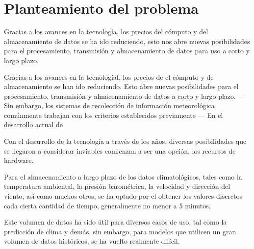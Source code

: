 \section{Planteamiento del problema}

Gracias a los avances en la tecnología, los precios del cómputo y del almacenamiento de datos se ha ido reduciendo, esto nos abre nuevas posibilidades para el procesamiento, transmisión y almacenamiento de datos para uso a corto y largo plazo.



Gracias a los avances en la tecnologíaf, los precios de el cómputo y de almacenamiento se han ido reduciendo. Esto abre nuevas posibilidades para el procesamiento, transmisión y almacenamiento de datos a corto y largo plazo. --- Sin embargo, los sistemas de recolección de información meteorológica comúnmente trabajan con los criterios establecidos previamente --- En el desarrollo actual de


Con el desarrollo de la tecnología a través de los años, diversas posibilidades que se llegaron a considerar inviables comienzan a ser una opción, los recursos de hardware.

Para el almacenamiento a largo plazo de los datos climatológicos, tales como la temperatura ambiental, la presión barométrica, la velocidad y dirección del viento, así como muchos otros, se ha optado por el obtener los valores discretos cada cierta cantidad de tiempo, generalmente no menor a 5 minutos. %

Este volumen de datos ha sido útil para diversos casos de uso, tal como la predicción de clima y demás, sin embargo, para modelos que utilicen un gran volumen de datos históricos, se ha vuelto realmente difícil.



